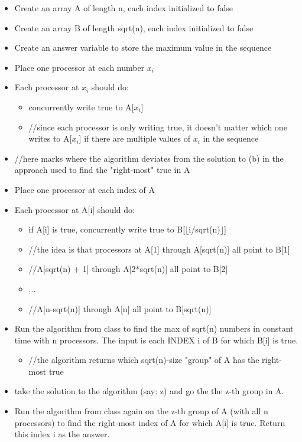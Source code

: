 \documentclass[a4paper]{article}
\begin{document}
\begin{itemize}
    \item Create an array A of length n, each index initialized to false
    \item Create an array B of length sqrt(n), each index initialized to false
    \item Create an answer variable to store the maximum value in the sequence
    \item Place one processor at each number $x_i$
    \item Each processor at $x_i$ should do:
    \begin{itemize}
        \item concurrently write true to A[$x_i$]
        \item //since each processor is only writing true, it doesn't matter which one writes to A[$x_i$] if there are multiple values of $x_i$ in the sequence
    \end{itemize}
    \item //here marks where the algorithm deviates from the solution to (b) in the approach used to find the "right-most" true in A
    \item Place one processor at each index of A
    \item Each processor at A[i] should do:
    \begin{itemize}
        \item if A[i] is true, concurrently write true to B[$\lfloor$i/sqrt(n)$\rfloor$]
        
        \item //the idea is that processors at A[1] through A[sqrt(n)] all point to B[1]
        \item //A[sqrt(n) + 1] through A[2*sqrt(n)] all point to B[2]
        \item ...
        \item //A[n-sqrt(n)] through A[n] all point to B[sqrt(n)]
    \end{itemize}
    \item Run the algorithm from class to find the max of sqrt(n) numbers in constant time with n processors. The input is each INDEX i of B for which B[i] is true.
    \begin{itemize}
        \item //the algorithm returns which sqrt(n)-size "group" of A has the right-most true
    \end{itemize}
    \item take the solution to the algorithm (say: z) and go the the z-th group in A.
    \item Run the algorithm from class again on the z-th group of A (with all n processors) to find the right-most index of A for which A[i] is true. Return this index i as the answer.
    
\end{itemize}
\end{document}
